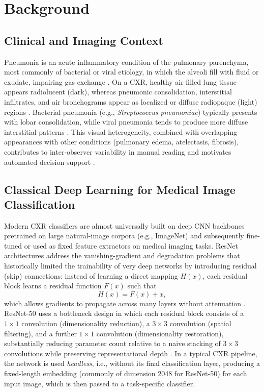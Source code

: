 \documentclass[11pt,a4paper]{article}
\begin{document}
\section{Background}
\label{sec:background}

\subsection{Clinical and Imaging Context}

Pneumonia is an acute inflammatory condition of the pulmonary parenchyma,
most commonly of bacterial or viral etiology, in which the alveoli fill with
fluid or exudate, impairing gas exchange \cite{iqwig2021}.  On a CXR, healthy
air-filled lung tissue appears radiolucent (dark), whereas pneumonic
consolidation, interstitial infiltrates, and air bronchograms appear as
localized or diffuse radiopaque (light) regions \cite{iqwig2021}.  Bacterial
pneumonia (e.g., \emph{Streptococcus pneumoniae}) typically presents with
lobar consolidation, while viral pneumonia tends to produce more diffuse
interstitial patterns \cite{iqwig2021}.  This visual heterogeneity, combined
with overlapping appearances with other conditions (pulmonary edema,
atelectasis, fibrosis), contributes to inter-observer variability in manual
reading and motivates automated decision support \cite{naz2020}.

\subsection{Classical Deep Learning for Medical Image Classification}

Modern CXR classifiers are almost universally built on deep CNN backbones
pretrained on large natural-image corpora (e.g., ImageNet) and subsequently
fine-tuned or used as fixed feature extractors on medical imaging tasks.
ResNet architectures address the vanishing-gradient and degradation problems
that historically limited the trainability of very deep networks by introducing
residual (skip) connections: instead of learning a direct mapping $H(x)$, each
residual block learns a residual function $F(x)$ such that
\begin{equation}
  H(x) = F(x) + x,
  \label{eq:resnet}
\end{equation}
which allows gradients to propagate across many layers without attenuation
\cite{he2016}.  ResNet-50 uses a bottleneck design in which each residual block
consists of a $1\times1$ convolution (dimensionality reduction), a $3\times3$
convolution (spatial filtering), and a further $1\times1$ convolution
(dimensionality restoration), substantially reducing parameter count relative
to a naive stacking of $3\times3$ convolutions while preserving
representational depth \cite{he2016}.  In a typical CXR pipeline, the network
is used \emph{headless}, i.e., without its final classification layer,
producing a fixed-length embedding (commonly of dimension 2048 for ResNet-50)
for each input image, which is then passed to a task-specific classifier.
\end{document}
